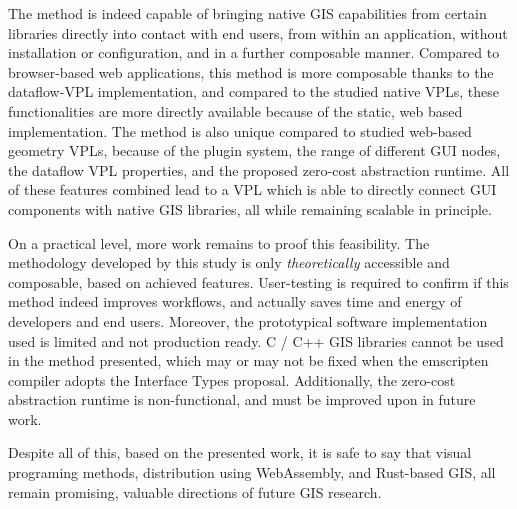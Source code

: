 The method is indeed capable of bringing native GIS capabilities from certain libraries directly into contact with end users, from within an application, without installation or configuration, and in a further composable manner. 
Compared to browser-based web applications, this method is more composable thanks to the dataflow-VPL implementation, 
and compared to the studied native VPLs, these functionalities are more directly available because of the static, web based implementation.
The method is also unique compared to studied web-based geometry VPLs, because of the plugin system, the range of different \ac{GUI} nodes, the dataflow VPL properties, and the proposed zero-cost abstraction runtime. 
All of these features combined lead to a VPL which is able to directly connect \ac{GUI} components with native \ac{GIS} libraries, all while remaining scalable in principle.

On a practical level, more work remains to proof this feasibility.
The methodology developed by this study is only \emph{theoretically} accessible and composable, based on achieved features. 
User-testing is required to confirm if this method indeed improves workflows, and actually saves time and energy of developers and end users. 
Moreover, the prototypical software implementation used is limited and not production ready.
C / C++ \ac{GIS} libraries cannot be used in the method presented, which may or may not be fixed when the emscripten compiler adopts the Interface Types proposal. 
Additionally, the zero-cost abstraction runtime is non-functional, and must be improved upon in future work.

Despite all of this, based on the presented work, it is safe to say that visual programing methods, distribution using WebAssembly, and Rust-based GIS, all remain promising, valuable directions of future \ac{GIS} research.





